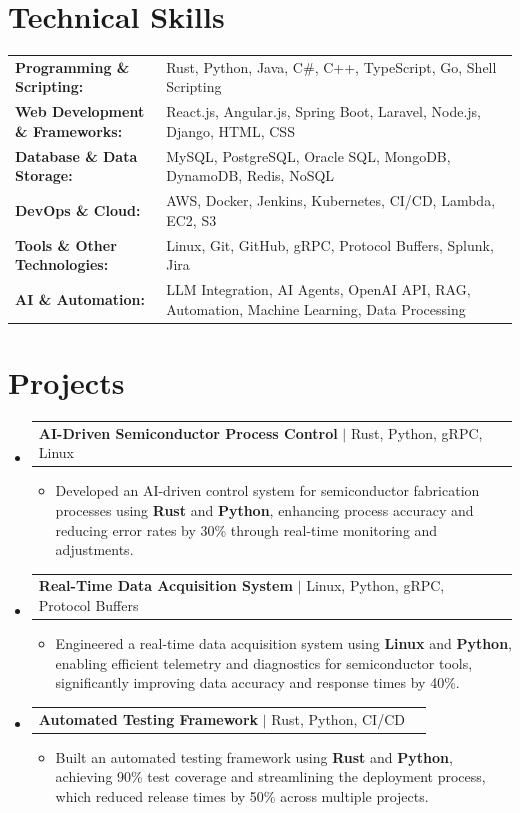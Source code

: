 \documentclass[letterpaper,10pt]{article}
\makeatletter
\newcommand{\resumeItem}[1]{
  \item{\fontsize{8pt}{9pt}\selectfont
    #1 \vspace{-3pt}
  }
}
\newcommand{\resumeProjectHeading}[2]{
    \item
    \begin{tabular*}{1.001\textwidth}{l@{\extracolsep{\fill}}r}
      \fontsize{8.5pt}{10pt}#1 & \textbf{\fontsize{8.5pt}{10pt} #2}\\
    \end{tabular*}\vspace{-7pt}
}
\newcommand{\resumeSubHeadingListStart}{\begin{itemize}[leftmargin=0pt, label={}]}
\newcommand{\resumeSubHeadingListEnd}{\end{itemize}}
\newcommand{\resumeItemListStart}{\begin{itemize}[leftmargin=*]}
\newcommand{\resumeItemListEnd}{\end{itemize}\vspace{-5pt}}
\makeatother
\begin{document}
\section{Technical Skills}
        \vspace{-14pt}
        \begin{table}[h]
            \fontsize{8pt}{9pt}\selectfont
            \begin{tabular}{p{0.3\linewidth} p{0.7\linewidth}}
                \textbf{Programming \& Scripting:} & Rust, Python, Java, C\#, C++, TypeScript, Go, Shell Scripting \\
                \textbf{Web Development \& Frameworks:} & React.js, Angular.js, Spring Boot, Laravel, Node.js, Django, HTML, CSS \\
                \textbf{Database \& Data Storage:} & MySQL, PostgreSQL, Oracle SQL, MongoDB, DynamoDB, Redis, NoSQL \\
                \textbf{DevOps \& Cloud:} & AWS, Docker, Jenkins, Kubernetes, CI/CD, Lambda, EC2, S3 \\
                \textbf{Tools \& Other Technologies:} & Linux, Git, GitHub, gRPC, Protocol Buffers, Splunk, Jira \\
                \textbf{AI \& Automation:} & LLM Integration, AI Agents, OpenAI API, RAG, Automation, Machine Learning, Data Processing \\
            \end{tabular}
        \end{table}
 \vspace{-18pt}

\section{Projects}
    \vspace{-5pt}
    \resumeSubHeadingListStart
          \resumeProjectHeading
            {\textbf{AI-Driven Semiconductor Process Control} $|$ Rust, Python, gRPC, Linux}{}
            \resumeItemListStart
                \resumeItem{Developed an AI-driven control system for semiconductor fabrication processes using \textbf{Rust} and \textbf{Python}, enhancing process accuracy and reducing error rates by 30\% through real-time monitoring and adjustments.}
            \resumeItemListEnd
        \vspace{-12pt}
    
        \resumeProjectHeading
            {\textbf{Real-Time Data Acquisition System} $|$ Linux, Python, gRPC, Protocol Buffers}{}
        \resumeItemListStart
                \resumeItem{Engineered a real-time data acquisition system using \textbf{Linux} and \textbf{Python}, enabling efficient telemetry and diagnostics for semiconductor tools, significantly improving data accuracy and response times by 40\%.}
        \resumeItemListEnd
      \vspace{-12pt}
      \resumeProjectHeading
        {\textbf{Automated Testing Framework} $|$ Rust, Python, CI/CD}{}
    \resumeItemListStart
            \resumeItem{Built an automated testing framework using \textbf{Rust} and \textbf{Python}, achieving 90\% test coverage and streamlining the deployment process, which reduced release times by 50\% across multiple projects.}
    \resumeItemListEnd
    \resumeSubHeadingListEnd
\end{document}
